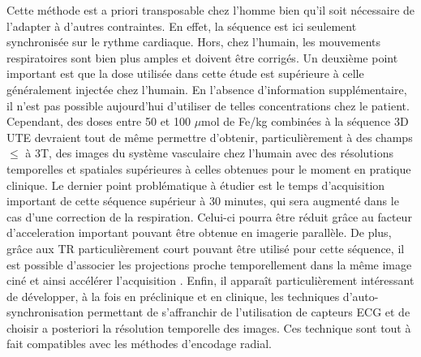  
Cette méthode est a priori transposable chez l'homme bien qu'il soit nécessaire de l'adapter à d'autres contraintes. En effet, la séquence est ici seulement synchronisée sur le rythme cardiaque. Hors, chez l’humain, les mouvements respiratoires sont bien plus amples et doivent être corrigés.
Un deuxième point important est que la dose utilisée dans cette étude est supérieure à celle généralement injectée chez l'humain. En l'absence d'information supplémentaire, il n'est pas possible aujourd'hui d'utiliser de telles concentrations chez le patient. Cependant, des doses entre 50 et 100 $\mu$mol de Fe/kg combinées à la séquence 3D UTE devraient tout de même permettre d'obtenir, particulièrement à des champs $\leq$ à 3T, des images du système vasculaire chez l’humain avec des résolutions temporelles et spatiales supérieures à celles obtenues pour le moment en pratique clinique. Le dernier point problématique à étudier est le temps d’acquisition important de cette séquence supérieur à 30 minutes, qui sera augmenté dans le cas d’une correction de la respiration. Celui-ci pourra être réduit grâce au facteur d’acceleration important pouvant être obtenue en imagerie parallèle. De plus, grâce aux TR particulièrement court pouvant être utilisé pour cette séquence, il est possible d’associer les projections proche temporellement dans la même image ciné et ainsi accélérer l’acquisition \cite{Trotier2015Time-resolved-T}.
Enfin, il apparaît particulièrement intéressant de développer, à la fois en préclinique et en clinique, les techniques d’auto-synchronisation permettant de s’affranchir de l’utilisation de capteurs ECG et de choisir a posteriori la résolution temporelle des images. Ces technique sont tout à fait compatibles avec les méthodes d’encodage radial.










